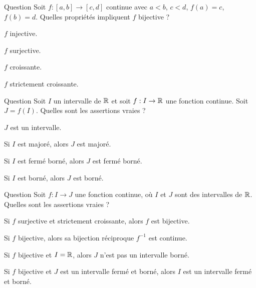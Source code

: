 \begin{multi}[multiple,feedback=
{Comme \(f(a)=c\), \(f(b)=d\), alors par le théorème des valeurs intermédiaires, toute valeur entre \(c\) et \(d\) est atteinte, autrement dit \(f\) est surjective. 
Si en plus \(f\) est injective (ce qui est le cas si \(f\) strictement croissante) alors \(f\) sera bijective.
}]{Question}
Soit \(f : [a,b] \to [c,d]\) continue avec \(a < b\), \(c < d\), \(f(a)=c\), \(f(b)=d\). Quelles propriétés impliquent \(f\) bijective ?

    \item* \(f\) injective.
    \item \(f\) surjective.
    \item \(f\) croissante.
    \item* \(f\) strictement croissante.
\end{multi}


\begin{multi}[multiple,feedback=
{Par une fonction continue, l'image d'un intervalle est un intervalle ;
l'image d'un intervalle fermé et borné est un intervalle fermé et borné. 
}]{Question}
Soit \(I\) un intervalle de \(\mathbb{R}\) et soit \(f : I \to \mathbb{R}\) une fonction continue. Soit \(J=f(I)\). Quelles sont les assertions vraies ?

    \item* \(J\) est un intervalle.
    \item Si \(I\) est majoré, alors \(J\) est majoré.
    \item* Si \(I\) est fermé borné, alors \(J\) est fermé borné.
    \item Si \(I\) est borné, alors \(J\) est borné.
\end{multi}


\begin{multi}[multiple,feedback=
{La bijection réciproque d'une fonction continue est continue. En particulier cela implique que pour \(f^{-1} : J \to I\), si \(J\) est un intervalle fermé et borné, alors \(I\) aussi.
}]{Question}
Soit \(f : I \to J\) une fonction continue, où \(I\) et \(J\) sont des intervalles de \(\mathbb{R}\). Quelles sont les assertions vraies ?

    \item* Si \(f\) surjective et strictement croissante, alors \(f\) est bijective.
    \item* Si \(f\) bijective, alors sa bijection réciproque \(f^{-1}\) est continue.
    \item Si \(f\) bijective et \(I=\mathbb{R}\), alors \(J\) n'est pas un intervalle borné.
    \item* Si \(f\) bijective et \(J\) est un intervalle fermé et borné, alors \(I\) est un intervalle fermé et borné.
\end{multi}

